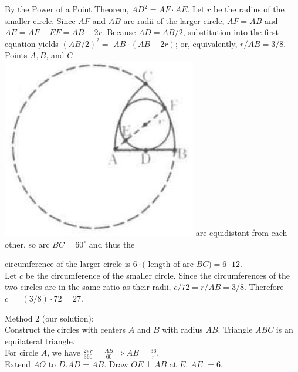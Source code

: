 \documentclass[10pt]{article}
\begin{document}
By the Power of a Point Theorem, \(A D^{2}=A F \cdot A E\). Let \(r\) be the radius of the smaller circle. Since \(A F\) and \(A B\) are radii of the larger circle, \(A F=A B\) and \(A E=A F-E F=A B-2 r\). Because \(A D=A B / 2\), substitution into the first equation yields \((A B / 2)^{2}=\) \(A B \cdot(A B-2 r)\); or, equivalently, \(r / A B=3 / 8\). Points \(A, B\), and \(C\)\\
\includegraphics[max width=\textwidth]{2025_04_17_97bc1f7e44d93c271a88g-212} are equidistant from each other, so arc \(B C=60^{\circ}\) and thus the


circumference of the larger circle is \(6 \cdot(\) length of arc \(B C)=6 \cdot 12\).\\
Let \(c\) be the circumference of the smaller circle. Since the circumferences of the two circles are in the same ratio as their radii, \(c / 72=r / A B=3 / 8\). Therefore \(c=\) \((3 / 8) \cdot 72=27\).

Method 2 (our solution):\\
Construct the circles with centers \(A\) and \(B\) with radius \(A B\). Triangle \(A B C\) is an equilateral triangle.\\
For circle \(A\), we have \(\frac{2 \pi r}{360}=\frac{A B}{60} \Rightarrow A B=\frac{36}{\pi}\).\\
Extend \(A O\) to \(D . A D=A B\). Draw \(O E \perp A B\) at \(E\). \(A E\) \(=6\).
\end{document}
